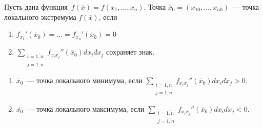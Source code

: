 \begin{theorem}
\label{th:sufficient_condition_of_local_extremum}
Пусть дана функция~$f(\overline x) = f(x_1, \ldots, x_n)$.
Точка $\overline x_0 = (x_{10}, \ldots, x_{n0})$~--- точка локального экстремума $f(\overline x)$, если
\begin{enumerate}
	\item $\displaystyle f_{x_1}'(\overline x_0) = \ldots = f_{x_n}'(\overline x_0) = 0$
	\item $\displaystyle \sum_{
	\begin{smallmatrix}
	i = \overline{1, n} \\
	j = \overline{1, n}
	\end{smallmatrix}
	} f_{x_i x_j}''(\overline x_0) dx_i dx_j$ сохраняет знак.
\end{enumerate}

\begin{enumerate}
	\item $\overline x_0$~--- точка локального минимума, если $\displaystyle \sum_{
	\begin{smallmatrix}
	i = \overline{1, n} \\
	j = \overline{1, n}
	\end{smallmatrix}
	} f_{x_i x_j}''(\overline x_0) dx_i dx_j > 0$.
	\item $\overline{x_0}$~--- точка локального максимума, если $\displaystyle \sum_{
	\begin{smallmatrix}
	i = \overline{1, n} \\
	j = \overline{1, n}
	\end{smallmatrix}
	} f_{x_i x_j}''(\overline x_0) dx_i dx_j < 0$.
\end{enumerate}
\end{theorem}
